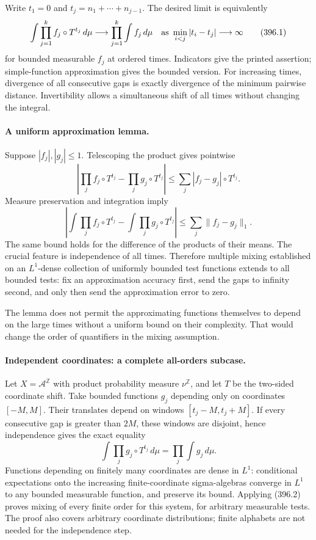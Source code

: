 \documentclass[11pt]{article}
\begin{document}
Write $t_1=0$ and $t_j=n_1+\cdots+n_{j-1}$. The desired limit is
equivalently
\[
 \int\prod_{j=1}^k f_j\circ T^{t_j}\,d\mu
       \longrightarrow\prod_{j=1}^k\int f_j\,d\mu
 \quad\hbox{as }\min_{i<j}|t_i-t_j|\longrightarrow\infty
 \tag{396.1}
\]
for bounded measurable $f_j$ at ordered times. Indicators give the
printed assertion; simple-function approximation gives the bounded
version. For increasing times, divergence of all consecutive gaps
is exactly divergence of the minimum pairwise distance. Invertibility
allows a simultaneous shift of all times without changing the integral.

\paragraph{A uniform approximation lemma.}
Suppose $|f_j|,|g_j|\leq1$. Telescoping the product gives pointwise
\[
 \left|\prod_j f_j\circ T^{t_j}-\prod_jg_j\circ T^{t_j}\right|
       \leq\sum_j|f_j-g_j|\circ T^{t_j}.
\]
Measure preservation and integration imply
\[
 \left|\int\prod_j f_j\circ T^{t_j}
       -\int\prod_jg_j\circ T^{t_j}\right|
       \leq\sum_j\|f_j-g_j\|_1.
 \tag{396.2}
\]
The same bound holds for the difference of the products of their
means. The crucial feature is independence of all times. Therefore
multiple mixing established on an $L^1$-dense collection of uniformly
bounded test functions extends to all bounded tests: fix an
approximation accuracy first, send the gaps to infinity second, and
only then send the approximation error to zero.

The lemma does not permit the approximating functions themselves to
depend on the large times without a uniform bound on their complexity.
That would change the order of quantifiers in the mixing assumption.

\paragraph{Independent coordinates: a complete all-orders subcase.}
Let $X=\mathcal A^{\mathbb Z}$ with product probability measure
$\nu^{\mathbb Z}$, and let $T$ be the two-sided coordinate shift.
Take bounded functions $g_j$ depending only on coordinates
$[-M,M]$. Their translates depend on windows
$[t_j-M,t_j+M]$. If every consecutive gap is greater than $2M$,
these windows are disjoint, hence independence gives the exact equality
\[
 \int\prod_jg_j\circ T^{t_j}\,d\mu
        =\prod_j\int g_j\,d\mu.
 \tag{396.3}
\]
Functions depending on finitely many coordinates are dense in $L^1$:
conditional expectations onto the increasing finite-coordinate
sigma-algebras converge in $L^1$ to any bounded measurable function,
and preserve its bound. Applying (396.2) proves mixing of every finite
order for this system, for arbitrary measurable tests. The proof
also covers arbitrary coordinate distributions; finite alphabets are
not needed for the independence step.
\end{document}
